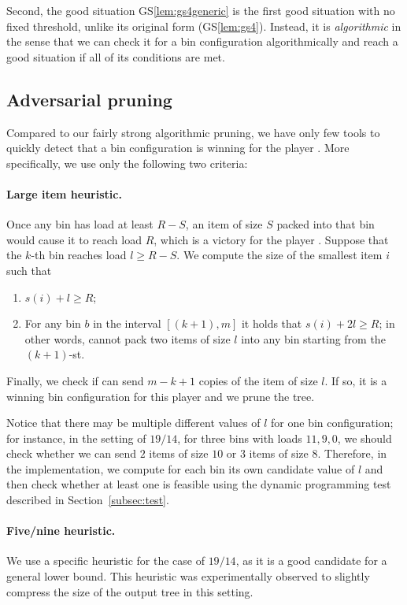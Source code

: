 Second, the good situation GS\ref{lem:gs4generic} is the first good
situation with no fixed threshold, unlike its original form
(GS\ref{lem:gs4}). Instead, it is \emph{algorithmic} in the sense that
we can check it for a bin configuration algorithmically and reach a
good situation if all of its conditions are met.

\subsection{Adversarial pruning}\label{sec:4:advpruning}

Compared to our fairly strong algorithmic pruning, we have only few
tools to quickly detect that a bin configuration is winning for the
player \adversary. More specifically, we use only the following two
criteria:

\paragraph{Large item heuristic.} Once any bin has load at least $R-S$,
an item of size $S$ packed into that bin would cause it to reach load
$R$, which is a victory for the player \adversary. Suppose that the
$k$-th bin reaches load $l \ge R-S$. We compute the size of the
smallest item $i$ such that

\begin{enumerate}
\item $s(i) + l \ge R$;
\item For any bin $b$ in the interval $[(k+1), m]$ it holds
that $s(i) + 2l \ge R$; in other words, \algo cannot pack
two items of size $l$ into any bin starting from the $(k+1)$-st.
\end{enumerate}

Finally, we check if \adversary can send $m-k+1$ copies of the item of
size $l$. If so, it is a winning bin configuration for this player and
we prune the tree.

Notice that there may be multiple different values of $l$ for one bin
configuration; for instance, in the setting of $19/14$, for three bins
with loads $11,9,0$, we should check whether we can send $2$ items of
size $10$ or $3$ items of size $8$. Therefore, in the implementation,
we compute for each bin its own candidate value of $l$ and then check
whether at least one is feasible using the dynamic programming test
described in Section~\ref{subsec:test}.

\paragraph{Five/nine heuristic.} We use a specific heuristic for the
case of $19/14$, as it is a good candidate for a general lower
bound. This heuristic was experimentally observed to slightly compress
the size of the output tree in this setting.

